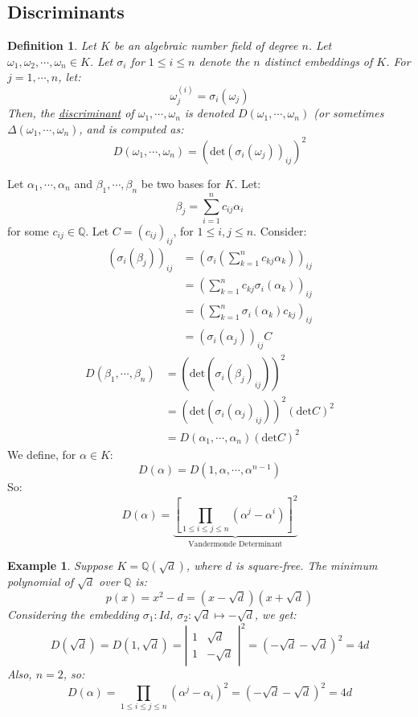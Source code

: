 \documentclass{article}
\newcommand{\Q}{\mathbb{Q}}
\newtheorem{example}{Example}[subsection]
\newtheorem{definition}{Definition}[subsection]
\begin{document}
\subsection{Discriminants}
\begin{definition}
Let $K$ be an algebraic number field of degree $n$. Let $\omega_1,\omega_2,\cdots, \omega_n\in K$. Let $\sigma_i$ for $1\leq i\leq n$ denote the $n$ distinct embeddings of $K$. For $j=1,\cdots, n$, let:
$$\omega_j^{(i)}=\sigma_i(\omega_j)$$
Then, the \underline{discriminant} of $\omega_1,\cdots, \omega_n$ is denoted $D(\omega_1,\cdots, \omega_n)$ (or sometimes $\Delta(\omega_1,\cdots, \omega_n)$, and is computed as:
$$D(\omega_1,\cdots, \omega_n)=(\text{det}(\sigma_i(\omega_j))_{ij})^2$$
\end{definition}
Let $\alpha_1,\cdots, \alpha_n$ and $\beta_1,\cdots , \beta_n$ be two bases for $K$. Let:
$$\beta_j=\displaystyle\sum_{i=1}^nc_{ij}\alpha_i$$
for some $c_{ij}\in\Q$. Let $C=(c_{ij})_{ij}$, for $1\leq i,j\leq n$. Consider:
\begin{align*}
    (\sigma_i(\beta_j))_{ij}&=(\sigma_i\left(\sum_{k=1}^nc_{kj}\alpha_k\right))_{ij}\\
    &=\left(\sum_{k=1}^nc_{kj}\sigma_i(\alpha_k)\right)_{ij}\\
    &=\left(\sum_{k=1}^n\sigma_i(\alpha_k)c_{kj}\right)_{ij}\\
    &=(\sigma_i(\alpha_j))_{ij}C
\end{align*}
\begin{align*}
    D(\beta_1,\cdots , \beta_n)&=(\text{det}(\sigma_i(\beta_j)_{ij}))^2\\
    &=(\text{det}(\sigma_i(\alpha_j)_{ij}))^2(\text{det} C)^2\\
    &=D(\alpha_1,\cdots ,\alpha_n)(\text{det} C)^2
\end{align*}
We define, for $\alpha\in K$:
$$D(\alpha)=D(1,\alpha, \cdots ,\alpha^{n-1})$$
So:
$$D(\alpha)=\underbrace{\left[ \prod_{1\leq i\leq j\leq n} (\alpha^j-\alpha^i)\right]^2}_{\text{Vandermonde Determinant}}$$
\begin{example}
Suppose $K=\Q(\sqrt{d})$, where $d$ is square-free. The minimum polynomial of $\sqrt{d}$ over $\Q$ is:
$$p(x)=x^2-d = (x-\sqrt{d})(x+\sqrt{d})$$
Considering the embedding $\sigma_1: Id$, $\sigma_2: \sqrt{d}\mapsto -\sqrt{d}$, we get:
$$D(\sqrt{d})=D(1,\sqrt{d})=\left|\begin{array}{cc}
    1 & \sqrt{d} \\
    1 & -\sqrt{d}
\end{array}\right|^2=(-\sqrt{d}-\sqrt{d})^2=4d$$
Also, $n=2$, so:
$$D(\alpha)=\prod_{1\leq i\leq j\leq n}(\alpha^j-\alpha_i)^2 = (-\sqrt{d}-\sqrt{d})^2=4d$$
\end{example}
\end{document}
